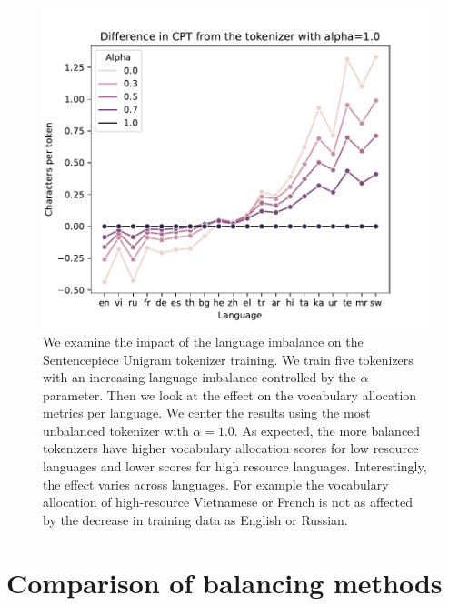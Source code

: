 \begin{figure}[H]
    \centering
    \includegraphics[width=\textwidth]{img/results/cpt_vs_alpha.pdf}
    \caption{We examine the impact of the language imbalance on the Sentencepiece Unigram tokenizer training. We train five tokenizers with an increasing language imbalance controlled by the $\alpha$ parameter. Then we look at the effect on the vocabulary allocation metrics per language. We center the results using the most unbalanced tokenizer with $\alpha=1.0$. As expected, the more balanced tokenizers have higher vocabulary allocation scores for low resource languages and lower scores for high resource languages. Interestingly, the effect varies across languages. For example the vocabulary allocation of high-resource Vietnamese or French is not as affected by the decrease in training data as English or Russian. }
    \label{fig:data_balance_vs_allocation_per_lang}
\end{figure}


\section{Comparison of balancing methods}
